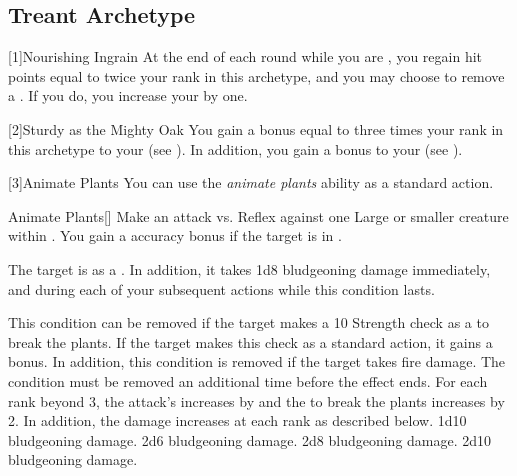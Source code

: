     \subsection{Treant Archetype}

        [1]{Nourishing Ingrain} At the end of each round while you are , you regain hit points equal to twice your rank in this archetype, and you may choose to remove a .
        If you do, you increase your  by one.

        [2]{Sturdy as the Mighty Oak} You gain a bonus equal to three times your rank in this archetype to your  (see ).
        In addition, you gain a  bonus to your  (see ).

        [3]{Animate Plants} You can use the \textit{animate plants} ability as a standard action.
        \begin{activeability}{Animate Plants}[]
            \rankline
            Make an attack vs. Reflex against one Large or smaller  creature within \medrange.
            You gain a  accuracy bonus if the target is in .

            \hit The target is \slowed as a .
            In addition, it takes 1d8 bludgeoning damage immediately, and during each of your subsequent actions while this condition lasts.

            This condition can be removed if the target makes a  10 Strength check as a  to break the plants.
            If the target makes this check as a standard action, it gains a  bonus.
            In addition, this condition is removed if the target takes fire damage.
            \crit The condition must be removed an additional time before the effect ends.
            \rankline
            For each rank beyond 3, the attack's  increases by  and the  to break the plants increases by 2.
            In addition, the damage increases at each rank as described below.
             1d10 bludgeoning damage.
             2d6 bludgeoning damage.
             2d8 bludgeoning damage.
             2d10 bludgeoning damage.
        \end{activeability}

